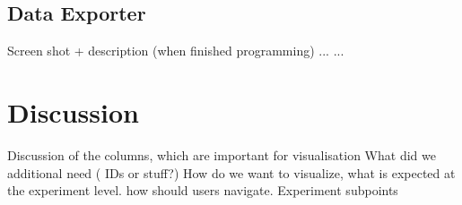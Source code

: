 \documentclass[a4paper, 11pt]{article}
\begin{document}
\subsection{Data Exporter}
Screen shot + description (when finished programming) ...
...  
\section{Discussion}
Discussion of the columns, which are important for visualisation
What did we additional need ( IDs or stuff?)
How do we want to visualize, what is expected at the experiment level. how should users navigate.
Experiment subpoints


\clearpage

\end{document}
